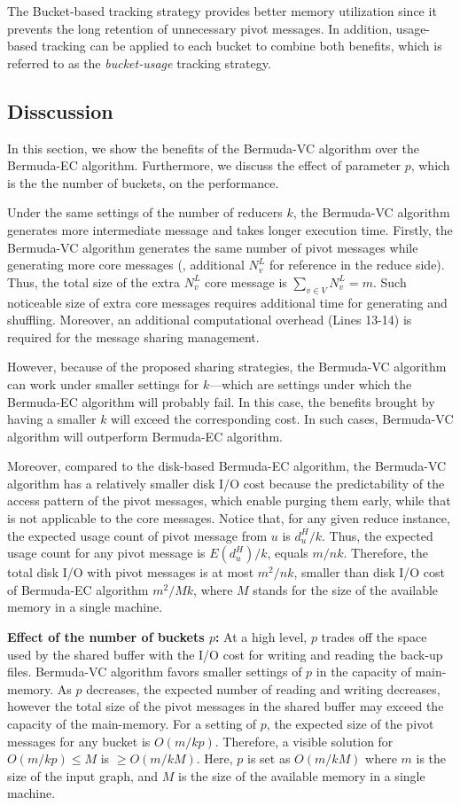 The Bucket-based tracking strategy provides better memory utilization since it prevents the long retention of unnecessary pivot messages. In addition, usage-based tracking  can be applied to each bucket to combine both benefits,  which is referred to as the {\em bucket-usage} tracking strategy. 

\subsection{Disscussion}
In this section, we show the benefits of the Bermuda-VC algorithm over the Bermuda-EC algorithm. 
Furthermore, we discuss the effect of  parameter $p$, which is the the number of buckets, on the performance.

Under the same settings of the number of reducers $k$, the Bermuda-VC algorithm generates more intermediate message and takes longer execution time.  Firstly, the Bermuda-VC algorithm generates the same number of pivot messages while generating more core messages ({\ie}, additional $N_v^L$ for reference in the reduce side).
Thus, the total size of the extra $N_v^L$ core message is $\sum_{v \in V} N_v^L=m$. 
Such noticeable size of extra core messages requires additional time for generating and shuffling. 
Moreover, an additional computational overhead (Lines 13-14) is required for the message sharing management. 

However, because of the proposed sharing strategies, the Bermuda-VC algorithm can work under smaller settings for $k$---which are settings under which the Bermuda-EC algorithm will probably fail.  In this case, the benefits brought by having a smaller $k$  will exceed the corresponding cost. In such cases, Bermuda-VC algorithm will outperform Bermuda-EC algorithm. 

Moreover, compared to the disk-based Bermuda-EC algorithm, the Bermuda-VC algorithm has a relatively smaller disk I/O cost because the predictability of the access pattern of the pivot messages, which enable purging them early, while that is not applicable to the core messages. Notice that, for any given reduce instance, the expected usage count of pivot message from $u$ is $d_u^H/k$. Thus, the expected usage count for any pivot message is $E(d_u^H)/k$, equals $m/nk$.  Therefore, the total disk I/O with pivot messages is at most $m^2/nk$, smaller than disk I/O cost of Bermuda-EC algorithm $m^2/Mk$, where $M$ stands for the size of the available memory in a single machine.

{\textbf{ Effect of the number of buckets $p$: }} At a high level, $p$ trades off the space used by the shared buffer with the I/O cost for writing and reading the back-up files. Bermuda-VC algorithm favors smaller settings of $p$ in the capacity of main-memory. As $p$ decreases, the expected number of reading and writing decreases, however the total size of the pivot messages in the shared buffer may exceed the capacity of the main-memory. 
For a setting of $p$, the expected size of the pivot messages for any bucket is $O(m/kp)$. Therefore, a visible solution for $O(m/kp) \le M$ is $ \ge O(m/kM)$. 
Here, $p$ is set as $O(m/kM)$ where $m$ is the size of the input graph, and $M$ is the size of the available memory in a single machine. 

